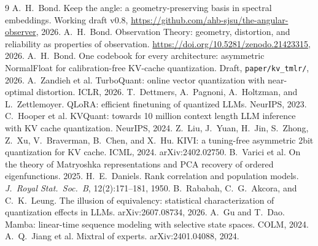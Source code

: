 \documentclass[11pt]{article}
\begin{document}
\begin{thebibliography}{9}
 A.~H.~Bond. Keep the angle: a geometry-preserving basis in
spectral embeddings. Working draft v0.8,
\url{https://github.com/ahb-sjsu/the-angular-observer}, 2026.
 A.~H.~Bond. Observation Theory: geometry, distortion, and
reliability as properties of observation.
\url{https://doi.org/10.5281/zenodo.21423315}, 2026.
 A.~H.~Bond. One codebook for every architecture: asymmetric
NormalFloat for calibration-free KV-cache quantization. Draft,
\texttt{paper/kv\_tmlr/}, 2026.
 A.~Zandieh et al. TurboQuant: online vector
quantization with near-optimal distortion. ICLR, 2026.
 T.~Dettmers, A.~Pagnoni, A.~Holtzman, and L.~Zettlemoyer.
QLoRA: efficient finetuning of quantized LLMs. NeurIPS, 2023.
 C.~Hooper et al. KVQuant: towards 10 million context
length LLM inference with KV cache quantization. NeurIPS, 2024.
 Z.~Liu, J.~Yuan, H.~Jin, S.~Zhong, Z.~Xu, V.~Braverman, B.~Chen,
and X.~Hu. KIVI: a tuning-free asymmetric 2bit quantization for KV cache. ICML,
2024. arXiv:2402.02750.
 B.~Varici et al. On the theory of Matryoshka
representations and PCA recovery of ordered eigenfunctions. 2025.
 H.~E.~Daniels. Rank correlation and population models.
\emph{J.\ Royal Stat.\ Soc.\ B}, 12(2):171--181, 1950.
 B.~Rababah, C.~G.~Akcora, and C.~K.~Leung. The illusion of
equivalency: statistical characterization of quantization effects in LLMs.
arXiv:2607.08734, 2026.
 A.~Gu and T.~Dao. Mamba: linear-time sequence modeling with
selective state spaces. COLM, 2024.
 A.~Q.~Jiang et al. Mixtral of experts.
arXiv:2401.04088, 2024.
\end{thebibliography}
\end{document}
